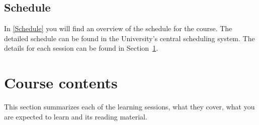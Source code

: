\subsection{Schedule}

In \cref{Schedule} you will find an overview of the schedule for the course.
The detailed schedule can be found in the University's central scheduling 
system.
The details for each session can be found in Section~\ref{CourseContents}.

\begin{frame}[allowframebreaks]

\end{frame}


\section{Course contents}%
\label{CourseContents}

This section summarizes each of the learning sessions, \ie what they cover, 
what you are expected to learn and its reading material.

